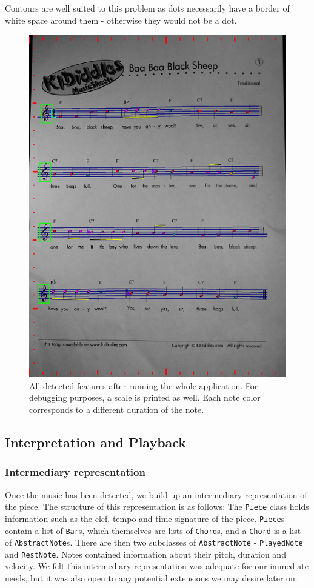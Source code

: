 Contours are well suited to this problem as dots necessarily have a border of white space around them - otherwise they would not be a dot.

\begin{figure}[ht!]
    \centering
    \includegraphics[width=1\textwidth]{./assets/detected.png}
    \caption{All detected features after running the whole application. For debugging purposes, a scale is printed as well. Each note color corresponds to a different duration of the note.}
    \label{image:detected}
\end{figure}

\subsection{Interpretation and Playback}
\subsubsection{Intermediary representation}
Once the music has been detected, we build up an intermediary representation of the piece. The structure of this representation is as follows:
The \verb!Piece! class holds information such as the clef, tempo and time signature of the piece. \verb!Piece!s contain a list of \verb!Bar!s, which themselves are lists of \verb!Chord!s, and a \verb!Chord! is a list of \verb!AbstractNote!s. There are then two subclasses of \verb!AbstractNote! - \verb!PlayedNote! and \verb!RestNote!. Notes contained information about their pitch, duration and velocity. We felt this intermediary representation was adequate for our immediate needs, but it was also open to any potential extensions we may desire later on.

